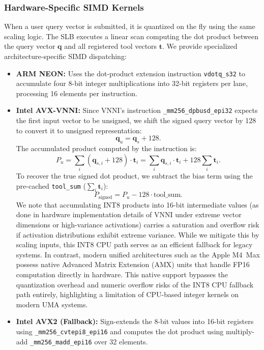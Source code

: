 \documentclass[conference,10pt]{IEEEtran}
\begin{document}
\subsubsection{Hardware-Specific SIMD Kernels}
When a user query vector is submitted, it is quantized on the fly using the same scaling logic. The SLB executes a linear scan computing the dot product between the query vector $\mathbf{q}$ and all registered tool vectors $\mathbf{t}$. We provide specialized architecture-specific SIMD dispatching:
\begin{itemize}
  \item \textbf{ARM NEON:} Uses the dot-product extension instruction \texttt{vdotq\_s32} to accumulate four 8-bit integer multiplications into 32-bit registers per lane, processing 16 elements per instruction.
  \item \textbf{Intel AVX-VNNI:} Since VNNI's instruction \texttt{\_mm256\_dpbusd\_epi32} expects the first input vector to be unsigned, we shift the signed query vector by 128 to convert it to unsigned representation:
  \begin{equation}
  \mathbf{q}_{u} = \mathbf{q}_{s} + 128.
  \end{equation}
  The accumulated product computed by the instruction is:
  \begin{equation}
  P_{u} = \sum_{i} (\mathbf{q}_{s,i} + 128) \cdot \mathbf{t}_{i} = \sum_{i} \mathbf{q}_{s,i} \cdot \mathbf{t}_{i} + 128 \sum_{i} \mathbf{t}_{i}.
  \end{equation}
  To recover the true signed dot product, we subtract the bias term using the pre-cached \texttt{tool\_sum} ($\sum_i \mathbf{t}_i$):
  \begin{equation}
  P_{\text{signed}} = P_{u} - 128 \cdot \text{tool\_sum}.
  \end{equation}
  We note that accumulating INT8 products into 16-bit intermediate values (as done in hardware implementation details of VNNI under extreme vector dimensions or high-variance activations) carries a saturation and overflow risk if activation distributions exhibit extreme variance. While we mitigate this by scaling inputs, this INT8 CPU path serves as an efficient fallback for legacy systems. In contrast, modern unified architectures such as the Apple M4~Max possess native Advanced Matrix Extension (AMX) units that handle FP16 computation directly in hardware. This native support bypasses the quantization overhead and numeric overflow risks of the INT8 CPU fallback path entirely, highlighting a limitation of CPU-based integer kernels on modern UMA systems.
  \item \textbf{Intel AVX2 (Fallback):} Sign-extends the 8-bit values into 16-bit registers using \texttt{\_mm256\_cvtepi8\_epi16} and computes the dot product using multiply-add \texttt{\_mm256\_madd\_epi16} over 32 elements.
\end{itemize}
\end{document}

